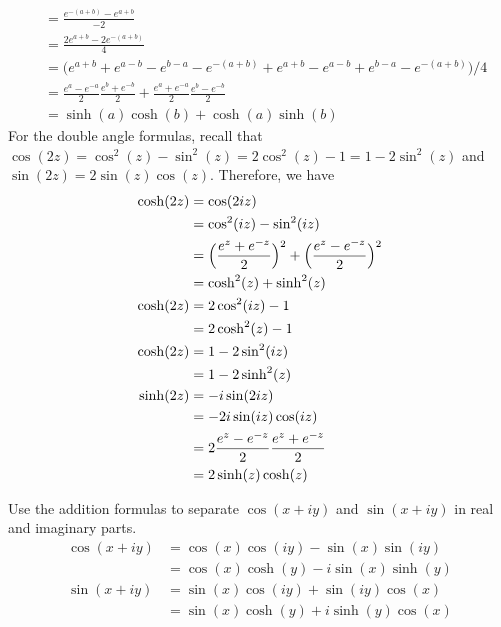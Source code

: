 \begin{exercise}
\begin{align*}
                 & = \frac{e^{-(a + b)} - e^{a + b}}{-2}\\
                 & = \frac{2e^{a + b} - 2e^{-(a + b)}}{4}\\
                 & = \bigl(e^{a + b} + e^{a - b} - e^{b - a} - e ^{-(a + b)} +
                   e^{a + b} - e^{a - b} + e^{b - a} - e^{-(a + b)}\bigr)/4\\
                 & = \frac{e^a - e^{-a}}{2}\frac{e^b + e^{-b}}{2} +
                   \frac{e^a + e^{-a}}{2}\frac{e^b - e^{-b}}{2}\\
                 & = \sinh(a)\cosh(b) + \cosh(a)\sinh(b)
  \end{align*}
  For the double angle formulas, recall that
  \(\cos(2z) = \cos^2(z) - \sin^2(z) = 2\cos^2(z) - 1 = 1 - 2\sin^2(z)\) and
  \(\sin(2z) = 2\sin(z)\cos(z)\).
  Therefore, we have
  \begin{align*}
    \cosh(2z) & = \cos(2iz)\\
              & = \cos^2(iz) - \sin^2(iz)\\
              & = \Bigl(\frac{e^z + e^{-z}}{2}\Bigr)^2 +
                \Bigl(\frac{e^z - e^{-z}}{2}\Bigr)^2\\
              & = \cosh^2(z) + \sinh^2(z)\\
    \cosh(2z) & = 2\cos^2(iz) - 1\\
              & = 2\cosh^2(z) - 1\\
    \cosh(2z) & = 1 - 2\sin^2(iz)\\
              & = 1 - 2\sinh^2(z)\\
    \sinh(2z) & = -i\sin(2iz)\\
              & = -2i\sin(iz)\cos(iz)\\
              & = 2\frac{e^z - e^{-z}}{2}\frac{e^z + e^{-z}}{2}\\
              & = 2\sinh(z)\cosh(z)
  \end{align*}
\item
  Use the addition formulas to separate \(\cos(x + iy)\) and \(\sin(x + iy)\)
  in real and imaginary parts.
  \begin{align*}
    \cos(x + iy) & = \cos(x)\cos(iy) - \sin(x)\sin(iy)\\
                 & = \cos(x)\cosh(y) - i\sin(x)\sinh(y)\\
    \sin(x + iy) & = \sin(x)\cos(iy) + \sin(iy)\cos(x)\\
                 & = \sin(x)\cosh(y) + i\sinh(y)\cos(x)
  \end{align*}
\item

\end{exercise}

